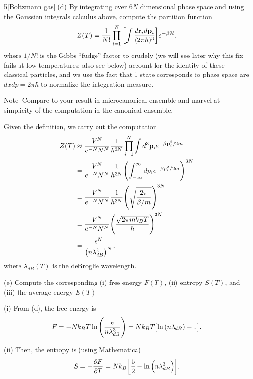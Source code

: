 \documentclass[12pt]{article}
\begin{document}
\begin{problem}{5}[Boltzmann gas]
(d) By integrating over $6N$ dimensional phase space and using the Gaussian
integrals calculus above, compute the partition function
\begin{equation}
    Z(T)=\frac1{N!}\prod_{i=1}^N\qty[\int\frac{d\vb{r}_id\vb{p}_i}{(2\pi\hbar)^3}]e^{-\beta\mathcal{H}}
    ,
\end{equation}
where $1/N!$ is the Gibbs ``fudge'' factor to crudely (we will see later why
this fix fails at low temperatures; also see below) account for the identity of
these classical particles, and we use the fact that 1 state corresponds to phase
space are $dxdp=2\pi\hbar$ to normalize the integration measure.

Note: Compare to your result in microcanonical ensemble and marvel at simplicity
of the computation in the canonical ensemble.

\begin{solution}
Given the definition, we carry out the computation
\begin{align}
    Z(T)
    &\approx\frac{V^N}{e^{-N}N^N}\frac1{h^{3N}}\prod_{i=1}^N\int d^3\vb{p}_i
    e^{-\beta \vb{p}_i^2/2m}\notag\\
    &=\frac{V^N}{e^{-N}{N^N}}
    \frac1{h^{3N}}\qty(\int_{-\infty}^\infty dp_ie^{-\beta
    p_i^2/2m})^{3N}\notag\\
    &=\frac{V^N}{e^{-N}N^N}\frac1{h^{3N}}\qty(\sqrt{\frac{2\pi}{\beta/m}})^{3N}\notag\\
    &=\frac{V^N}{e^{-N}N^N}\qty(\frac{\sqrt{2\pi mk_BT}}{h})^{3N}\notag\\
    &=\frac{e^N}{\qty(n\lambda_{dB}^3)^N},
\end{align}
where $\lambda_{dB}(T)$ is the deBroglie wavelength.
\end{solution}

(e) Compute the corresponding (i) free energy $F(T)$, (ii) entropy $S(T)$, and
(iii) the average energy $E(T)$.

\begin{solution}

(i) From (d), the free energy is
\begin{equation}
    F=-Nk_BT\ln\qty(\frac{e}{n\lambda_{dB}^3})
    =Nk_BT\qty[\ln\qty(n\lambda_{dB})-1].
\end{equation}

(ii) Then, the entropy is (using Mathematica)
\begin{equation}
    S=-\frac{\partial F}{\partial T}
    =Nk_B\qty[\frac52-\ln\qty(n\lambda_{dB}^3)].
\end{equation}


\end{solution}
\end{problem}
\end{document}
